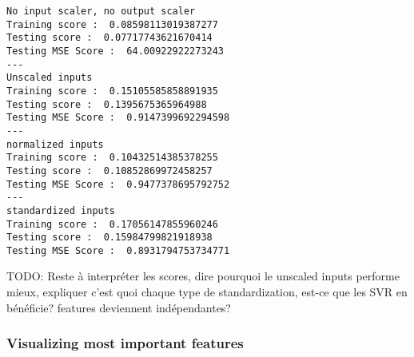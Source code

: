 \documentclass[11pt]{article}
\begin{document}
    \begin{Verbatim}[commandchars=\\\{\}]
No input scaler, no output scaler
Training score :  0.08598113019387277
Testing score :  0.07717743621670414
Testing MSE Score :  64.00922922273243
---
Unscaled inputs
Training score :  0.15105585858891935
Testing score :  0.1395675365964988
Testing MSE Score :  0.9147399692294598
---
normalized inputs
Training score :  0.10432514385378255
Testing score :  0.10852869972458257
Testing MSE Score :  0.9477378695792752
---
standardized inputs
Training score :  0.17056147855960246
Testing score :  0.15984799821918938
Testing MSE Score :  0.8931794753734771

    \end{Verbatim}

    TODO: Reste à interpréter les scores, dire pourquoi le unscaled inputs
performe mieux, expliquer c'est quoi chaque type de standardization,
est-ce que les SVR en bénéficie? features deviennent indépendantes?

    \subsubsection{Visualizing most important
features}\label{visualizing-most-important-features}
\end{document}
